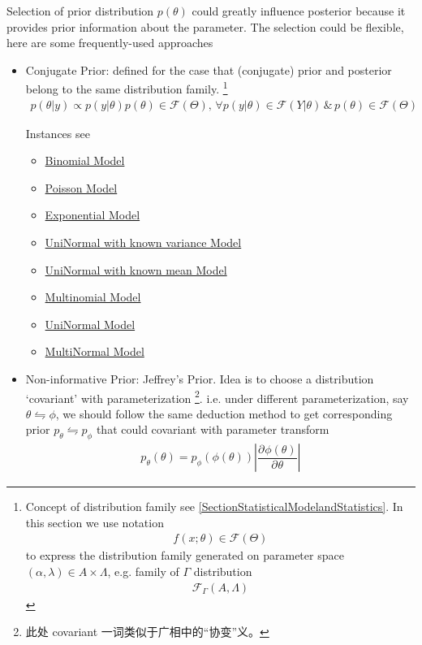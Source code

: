 Selection of prior distribution $ p(\theta ) $ could greatly influence posterior because it provides prior information about the parameter. The selection could be flexible, here are some frequently-used approaches
\begin{itemize}[topsep=2pt,itemsep=0pt]
    \item Conjugate Prior: defined for the case that (conjugate) prior and posterior belong to the same distribution family. 
    \footnote{Concept of distribution family see \autoref{SectionStatisticalModelandStatistics}. In this section we use notation 
    \begin{align*}
        f(x;\theta )\in\mathscr{F}(\Theta) 
    \end{align*}
    to express the distribution family generated on parameter space $ (\alpha ,\lambda )\in A\times \Lambda  $, e.g. family of $ \Gamma  $ distribution
    \begin{align*}
        \mathscr{F}_\Gamma (A,\Lambda ) 
    \end{align*}
    }
    \begin{align*}
        p(\theta |y)\propto p(y|\theta)p(\theta)\in \mathscr{F}(\Theta ) ,\,\forall p(y|\theta)\in\mathscr{F}{(Y|\theta) } \,\&\, p(\theta )\in\mathscr{F}(\Theta ) 
    \end{align*}

    Instances see 
    \begin{itemize}[topsep=2pt,itemsep=-1pt]
        \item \hyperlink{BinomConjugate}{Binomial Model}
        \item \hyperlink{PoissonConjugate}{Poisson Model}
        \item \hyperlink{ExpConjugate}{Exponential Model}
        \item \hyperlink{NormalWithVarConjugate}{UniNormal with known variance Model}
        \item \hyperlink{NormalWithMeanConjugate}{UniNormal with known mean Model}
        \item \hyperlink{MultinomConjugate}{Multinomial Model}
        \item \hyperlink{NormalConjugate}{UniNormal Model}
        \item \hyperlink{MultiNormalConjugate}{MultiNormal Model}
    \end{itemize}

    \item Non-informative Prior: Jeffrey's Prior. Idea is to choose a distribution `covariant' with parameterization \footnote{此处 covariant 一词类似于广相中的“协变”义。}. i.e. under different parameterization, say $ \theta \leftrightharpoons \phi $, we should follow the same deduction method to get corresponding prior $ p_\theta \leftrightharpoons p_\phi  $ that could covariant with parameter transform 
    \begin{align*}
        p_\theta (\theta )=p_\phi (\phi (\theta ))\left| \dfrac{\partial^{} \phi(\theta )  }{\partial ^{} \theta } \right| 
    \end{align*}
    

\end{itemize}
